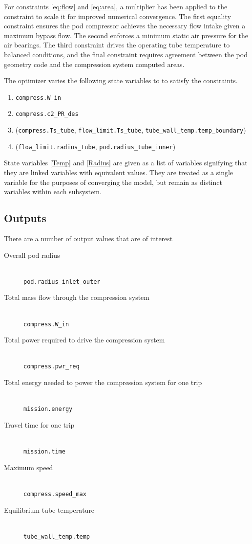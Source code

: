 \documentclass[heading.tex]{subfiles}
\begin{document}
For constraints \ref{eq:flow} and \ref{eq:area}, a multiplier has been applied to the constraint to scale it for improved numerical convergence.
The first equality constraint ensures the pod compressor achieves the necessary flow intake given a maximum bypass flow.
The second enforces a minimum static air pressure for the air bearings. The third constraint drives the operating tube temperature to balanced conditions,
and the final constraint requires agreement between the pod geometry code and the compression system computed areas.

The optimizer varies  the following state variables to to satisfy the constraints. 

\begin{enumerate}
\item \texttt{compress.W\_in}
\item \texttt{compress.c2\_PR\_des}
\item (\texttt{compress.Ts\_tube}, \texttt{flow\_limit.Ts\_tube}, \texttt{tube\_wall\_temp.temp\_boundary}) \label{Temp}
\item (\texttt{flow\_limit.radius\_tube}, \texttt{pod.radius\_tube\_inner}) \label{Radius}
\end{enumerate}

State variables \ref{Temp} and \ref{Radius} are given as a list of variables signifying that they are linked variables with equivalent values. They are
treated as a single variable for the purposes of converging the model, but remain as distinct variables within each subsystem.

\subsection{Outputs}
There are a number of output values that are of interest

\begin{description}
  \item[Overall pod radius] \hfill \\
  \texttt{pod.radius\_inlet\_outer}
  \item[Total mass flow through the compression system] \hfill \\
  \texttt{compress.W\_in}
  \item[Total power required to drive the compression system] \hfill \\
  \texttt{compress.pwr\_req}
  \item[Total energy needed to power the compression system for one trip] \hfill \\
  \texttt{mission.energy}
  \item[Travel time for one trip] \hfill \\
  \texttt{mission.time}
  \item[Maximum speed] \hfill \\
  \texttt{compress.speed\_max}
  \item[Equilibrium tube temperature] \hfill \\
  \texttt{tube\_wall\_temp.temp}
\end{description}
\end{document}
